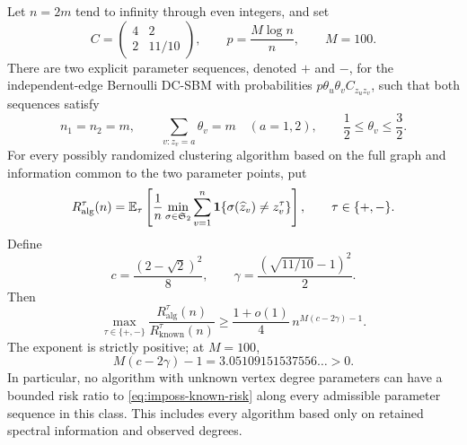 \begin{theorem}
\label{thm:imposs}
Let \(n=2m\) tend to infinity through even integers, and set
\begin{equation}
 C=\begin{pmatrix}4&2\\2&11/10\end{pmatrix},\qquad
 p=\frac{M\log n}{n},\qquad M=100.
 \label{eq:imposs-model}
\end{equation}
There are two explicit parameter sequences, denoted \(+\) and \(-\), for
the independent-edge Bernoulli DC-SBM with probabilities
\(p\theta_u\theta_vC_{z_uz_v}\), such that both sequences satisfy
\begin{equation}
 n_1=n_2=m,\qquad
 \sum_{v:z_v=a}\theta_v=m\quad(a=1,2),\qquad
 \frac12\le\theta_v\le\frac32.
 \label{eq:imposs-normalization}
\end{equation}
For every possibly randomized clustering algorithm based on the full graph
and information common to the two parameter points, put
\begin{equation}
 R_{\mathrm{alg}}^\tau(n)
   =\mathbb E_\tau\left[
       \frac1n\min_{\sigma\in\mathfrak S_2}
       \sum_{v=1}^n\mathbf1\{\sigma(\widehat z_v)\ne z_v^\tau\}
     \right],\qquad \tau\in\{+,-\}.
 \label{eq:imposs-alg-risk}
\end{equation}
Define
\begin{equation}
 c=\frac{(2-\sqrt2)^2}{8},\qquad
 \gamma=\frac{(\sqrt{11/10}-1)^2}{2}.
 \label{eq:imposs-constants}
\end{equation}
Then
\begin{equation}
 \max_{\tau\in\{+,-\}}
 \frac{R_{\mathrm{alg}}^\tau(n)}{R_{\mathrm{known}}^\tau(n)}
 \ge \frac{1+o(1)}4\,
       n^{M(c-2\gamma)-1}.
 \label{eq:imposs-ratio}
\end{equation}
The exponent is strictly positive; at \(M=100\),
\begin{equation}
 M(c-2\gamma)-1
   =3.05109151537556\ldots>0.
 \label{eq:imposs-positive-gap}
\end{equation}
In particular, no algorithm with unknown vertex degree parameters can have
a bounded risk ratio to \eqref{eq:imposs-known-risk} along every admissible
parameter sequence in this class. This includes every algorithm based only
on retained spectral information and observed degrees.
\end{theorem}

